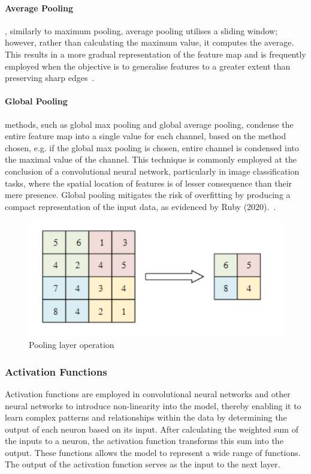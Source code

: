 \paragraph{Average Pooling}
, similarly to maximum pooling, average pooling utilises a sliding window; however, rather than
calculating the maximum value, it computes the average. This results in a more gradual
representation of the feature map and is frequently employed when the objective is to generalise
features to a greater extent than preserving sharp edges~\cite{GU2018354}.


\paragraph{Global Pooling}
methods, such as global max pooling and global average pooling, condense the entire feature map into a single value for each channel,
based on the method chosen, e.g. if the global max pooling is chosen, entire channel is condensed into the maximal value of the channel.
This technique is commonly employed at the conclusion of a convolutional neural network, particularly in image classification tasks, where the spatial location of features is of lesser consequence than their mere presence. Global pooling mitigates the risk of overfitting by producing a compact representation of the input data, as evidenced by Ruby (2020).~\cite{GU2018354}.


\begin{figure}[h]
\centering
\includegraphics[width=.50\textwidth]{figures/pooling}
\caption{Pooling layer operation~\cite{article}}
\label{fig:pooling}
\end{figure}



\subsubsection{Activation Functions}\label{subsec:activation-functions}

Activation functions are employed in convolutional neural networks and other neural networks to introduce non-linearity into the model,
thereby enabling it to learn complex patterns and relationships within the data by determining the output of each neuron based on its input.
After calculating the weighted sum of the inputs to a neuron, the activation function transforms this sum into the output. These functions allows the model to represent a wide range of functions.
The output of the activation function serves as the input to the next layer.

